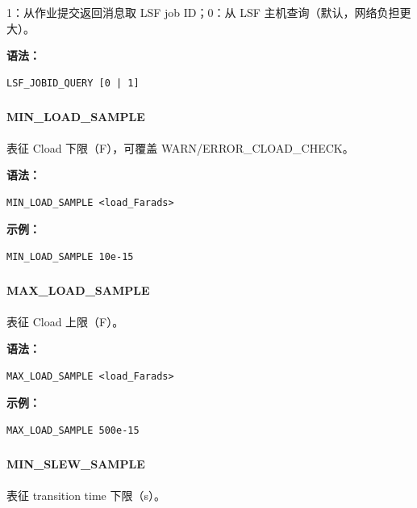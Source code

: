 1：从作业提交返回消息取 LSF job ID；0：从 LSF 主机查询（默认，网络负担更大）。

\textbf{语法：}
\begin{lstlisting}
LSF_JOBID_QUERY [0 | 1]
\end{lstlisting}

\subsubsection{}
\paragraph*{MIN_LOAD_SAMPLE}

表征 Cload 下限（F），可覆盖 WARN/ERROR\_CLOAD\_CHECK。

\textbf{语法：}
\begin{lstlisting}
MIN_LOAD_SAMPLE <load_Farads>
\end{lstlisting}

\textbf{示例：}
\begin{lstlisting}
MIN_LOAD_SAMPLE 10e-15
\end{lstlisting}

\subsubsection{}
\paragraph*{MAX_LOAD_SAMPLE}

表征 Cload 上限（F）。

\textbf{语法：}
\begin{lstlisting}
MAX_LOAD_SAMPLE <load_Farads>
\end{lstlisting}

\textbf{示例：}
\begin{lstlisting}
MAX_LOAD_SAMPLE 500e-15
\end{lstlisting}

\subsubsection{}
\paragraph*{MIN_SLEW_SAMPLE}

表征 transition time 下限（s）。

